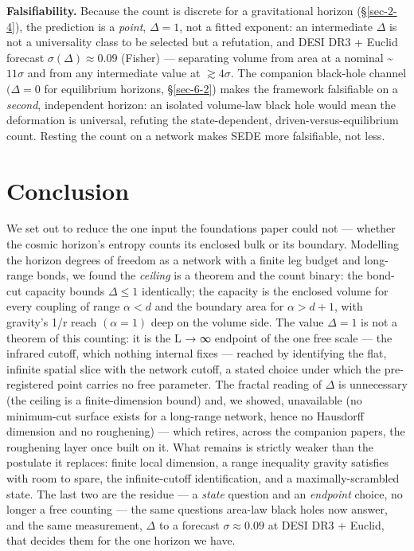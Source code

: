 \documentclass[12pt]{iopart}
\begin{document}
\textbf{Falsifiability.} Because the count is discrete for a
gravitational horizon (§\ref{sec-2-4}), the prediction is a
\emph{point}, \(\Delta  = 1\), not a fitted exponent: an intermediate
\(\Delta\) is not a universality class to be selected but a refutation,
and DESI DR3 + Euclid forecast \(\sigma (\Delta ) \approx  0.09\)
(Fisher) --- separating volume from area at a nominal
\textasciitilde{}\(11\sigma\) and from any intermediate value at
\(\gtrsim  4\sigma\). The companion black-hole channel \((\Delta  = 0\)
for equilibrium horizons, §\ref{sec-6-2}) makes the framework
falsifiable on a \emph{second}, independent horizon: an isolated
volume-law black hole would mean the deformation is universal, refuting
the state-dependent, driven-versus-equilibrium count. Resting the count
on a network makes SEDE more falsifiable, not less.

\section{Conclusion}\label{sec-9}

We set out to reduce the one input the foundations paper could not ---
whether the cosmic horizon's entropy counts its enclosed bulk or its
boundary. Modelling the horizon degrees of freedom as a network with a
finite leg budget and long-range bonds, we found the \emph{ceiling} is a
theorem and the count binary: the bond-cut capacity bounds
\(\Delta  \leq  1\) identically; the capacity is the enclosed volume for
every coupling of range \(\alpha  < d\) and the boundary area for
\(\alpha  > d+1\), with gravity's 1/r reach \((\alpha  = 1)\) deep on
the volume side. The value \(\Delta  = 1\) is not a theorem of this
counting: it is the L → ∞ endpoint of the one free scale --- the
infrared cutoff, which nothing internal fixes --- reached by identifying
the flat, infinite spatial slice with the network cutoff, a stated
choice under which the pre-registered point carries no free parameter.
The fractal reading of \(\Delta\) is unnecessary (the ceiling is a
finite-dimension bound) and, we showed, unavailable (no minimum-cut
surface exists for a long-range network, hence no Hausdorff dimension
and no roughening) --- which retires, across the companion papers, the
roughening layer once built on it. What remains is strictly weaker than
the postulate it replaces: finite local dimension, a range inequality
gravity satisfies with room to spare, the infinite-cutoff
identification, and a maximally-scrambled state. The last two are the
residue --- a \emph{state} question and an \emph{endpoint} choice, no
longer a free counting --- the same questions area-law black holes now
answer, and the same measurement, \(\Delta\) to a forecast
\(\sigma  \approx  0.09\) at DESI DR3 + Euclid, that decides them for
the one horizon we have.
\end{document}
